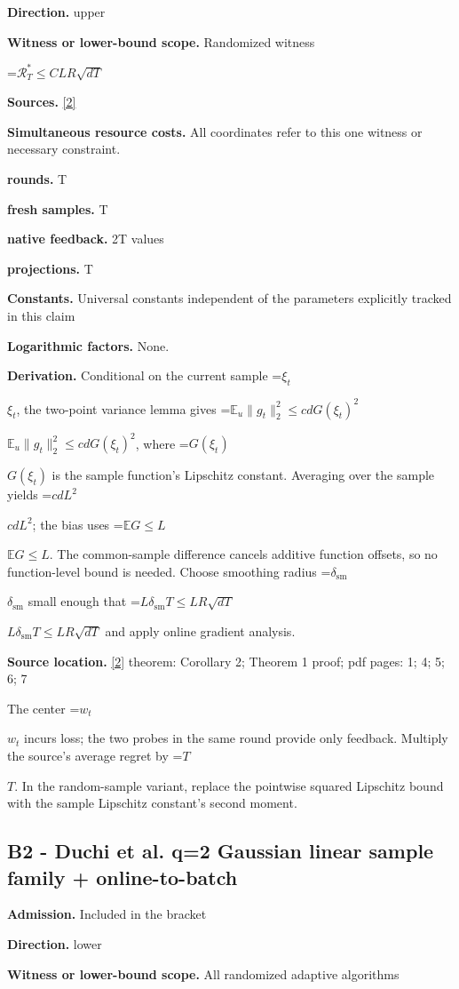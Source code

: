 \documentclass[10pt,a4paper]{article}
\newcommand{\AtlasMath}[1]{\par\begingroup\centering\setbox0=\hbox{$\displaystyle #1$}\ifdim\wd0>1.4\linewidth\typeout{ATLAS WIDE FORMULA: \the\wd0}\fi\ifdim\wd0>\linewidth\resizebox{\linewidth}{!}{\box0}\else\box0\fi\par\endgroup}
\newcommand{\AtlasInlineMath}[1]{\begingroup\setbox0=\hbox{$#1$}\ifdim\wd0>.4\linewidth\endgroup\AtlasMath{#1}\else\endgroup$#1$\fi}
\begin{document}
\textbf{Direction.} upper

\textbf{Witness or lower-bound scope.} Randomized witness

\AtlasMath{\mathcal{R}_T^*\le C L R\sqrt{dT}}
\textbf{Sources.} \href{https://jmlr.org/papers/volume18/16-632/16-632.pdf}{[2]}

\textbf{Simultaneous resource costs.} All coordinates refer to this one witness or necessary constraint.

\textbf{rounds.} T

\textbf{fresh samples.} T

\textbf{native feedback.} 2T values

\textbf{projections.} T

\textbf{Constants.} Universal constants independent of the parameters explicitly tracked in this claim

\textbf{Logarithmic factors.} None.

\textbf{Derivation.} Conditional on the current sample \AtlasInlineMath{\xi_t}, the two-point variance lemma gives \AtlasInlineMath{\mathbb E_u\|g_t\|_2^2\le cdG(\xi_t)^2}, where \AtlasInlineMath{G(\xi_t)} is the sample function's Lipschitz constant. Averaging over the sample yields \AtlasInlineMath{cdL^2}; the bias uses \AtlasInlineMath{\mathbb EG\le L}. The common-sample difference cancels additive function offsets, so no function-level bound is needed. Choose smoothing radius \AtlasInlineMath{\delta_{\mathrm{sm}}} small enough that \AtlasInlineMath{L\delta_{\mathrm{sm}} T\le LR\sqrt{dT}} and apply online gradient analysis.

\textbf{Source location.} \href{https://jmlr.org/papers/volume18/16-632/16-632.pdf}{[2]} theorem: Corollary 2; Theorem 1 proof; pdf pages: 1; 4; 5; 6; 7

The center \AtlasInlineMath{w_t} incurs loss; the two probes in the same round provide only feedback. Multiply the source's average regret by \AtlasInlineMath{T}. In the random-sample variant, replace the pointwise squared Lipschitz bound with the sample Lipschitz constant's second moment.

\subsection{B2 - Duchi et al. q=2 Gaussian linear sample family + online-to-batch}
\textbf{Admission.} Included in the bracket

\textbf{Direction.} lower

\textbf{Witness or lower-bound scope.} All randomized adaptive algorithms
\end{document}
